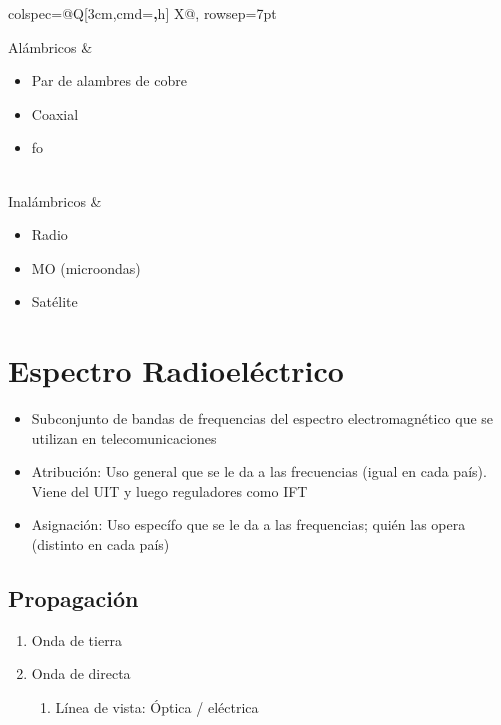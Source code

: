 \documentclass[letterpaper]{article}
\begin{document}
\begin{longtblr}{
    colspec={@{}Q[3cm,cmd=\textbf,h] X@{}},
    rowsep={7pt}
  }

  Alámbricos 
  & \begin{minipage}{\linewidth}
    \begin{itemize}
      \item Par de alambres de cobre 
      \item Coaxial 
      \item fo
    \end{itemize}
  \end{minipage}
  \\
  Inalámbricos 
  & \begin{minipage}{\linewidth}
    \begin{itemize}
      \item Radio 
      \item MO (microondas) 
      \item Satélite
    \end{itemize}
  \end{minipage}
\end{longtblr}

\section*{Espectro Radioeléctrico}

\begin{itemize}
  \item Subconjunto de bandas de frequencias del espectro electromagnético que se utilizan en telecomunicaciones 
  \item Atribución: Uso general que se le da a las frecuencias  (igual en cada país). Viene del UIT y luego reguladores como IFT
  \item Asignación: Uso específo que se le da a las frequencias; quién las opera (distinto en cada país)
\end{itemize}

\subsection*{Propagación}
\begin{enumerate}
  \item Onda de tierra
  \item Onda de directa
    \begin{enumerate}
      \item Línea de vista: Óptica / eléctrica
    \end{enumerate}
\end{enumerate}
\end{document}

